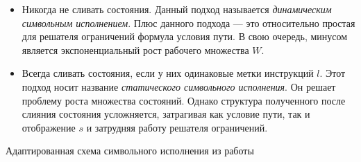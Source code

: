 \begin{enumerate}
    \begin{itemize}
        \item Никогда не сливать состояния. Данный подход называется \emph{динамическим символьным исполнением}. Плюс данного подхода --- это относительно простая для решателя ограничений формула условия пути. В свою очередь, минусом является экспоненциальный рост рабочего множества $W$.
        \item Всегда сливать состояния, если у них одинаковые метки инструкций $l$. Этот подход носит название \emph{статического символьного исполнения}. Он решает проблему роста множества состояний. Однако структура полученного после слияния состояния усложняется, затрагивая как условие пути, так и отображение $s$ и затрудняя работу решателя ограничений.
    \end{itemize}
\end{enumerate}

\pagebreak
\addtocounter{algocf}{1}
\begin{algorithm2e}[]
    \caption{Адаптированная схема символьного исполнения из работы~\cite{kuznetsov2012efficient}}
    \label{alg-kuznetsov}
    \small
    \setcounter{AlgoLine}{0}
    \SetAlgoSkip{}

\end{algorithm2e}

